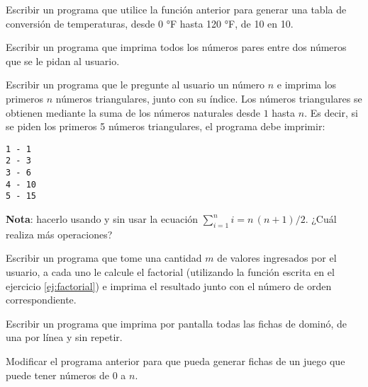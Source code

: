 \begin{ejercicio}
Escribir un programa que utilice la función anterior para generar una tabla de conversión de
temperaturas, desde 0 °F hasta 120 °F, de 10 en 10.
\end{ejercicio}

\begin{ejercicio}
Escribir un programa que imprima todos los números pares entre dos números
que se le pidan al usuario.
\end{ejercicio}

\begin{ejercicio}
Escribir un programa que le pregunte al usuario un número $n$
e imprima los primeros $n$ números triangulares, junto con su
índice. Los números triangulares se obtienen mediante la suma de los números
naturales desde $1$ hasta $n$.  Es decir, si se piden los primeros 5
números triangulares, el programa debe imprimir:

\begin{verbatim}
1 - 1
2 - 3
3 - 6
4 - 10
5 - 15
\end{verbatim}

{\bf Nota}: hacerlo usando y sin usar la ecuación $\sum_{i=1}^n i = n\,(n+1)/2$.
¿Cuál realiza más operaciones?
\end{ejercicio}

\begin{ejercicio}
Escribir un programa que tome una cantidad $m$ de valores ingresados
por el usuario, a cada uno le calcule el factorial (utilizando la función escrita en el ejercicio
\ref{ej:factorial}) e imprima el resultado junto con el número de orden correspondiente.
\end{ejercicio}

\begin{ejercicio}
Escribir un programa que imprima por pantalla todas las fichas de dominó, de
una por línea y sin repetir.
\end{ejercicio}

\begin{ejercicio}
Modificar el programa anterior para que pueda generar fichas de un juego
que puede tener números de 0 a $n$.
\end{ejercicio}
